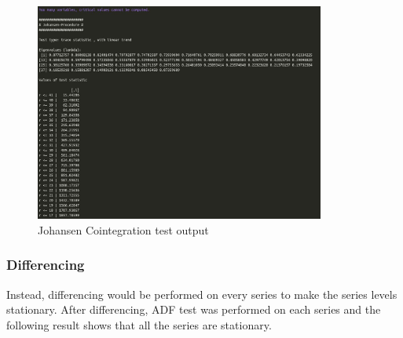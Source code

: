 \documentclass[12pt, letterpaper] {article}
\begin{document}
\begin{figure}[H]
    \centering
    \includegraphics[width=0.85\textwidth, height=0.6\textheight]{Images/Johansen.jpg}
    \caption{Johansen Cointegration test output}
    \label{fig:Johansen Cointegration test output}
\end{figure}


\subsubsection{Differencing}
Instead, differencing would be performed on every series to make the series levels stationary. After differencing, ADF test was performed on each series and the following result shows that all the series are stationary. 
\end{document}
